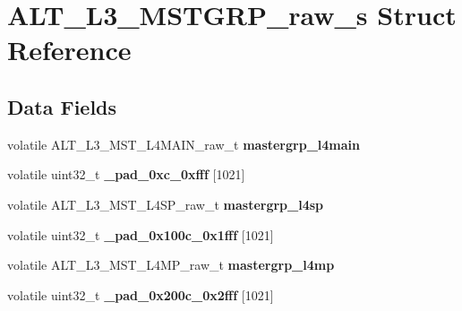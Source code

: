 \hypertarget{structALT__L3__MSTGRP__raw__s}{}\section{A\+L\+T\+\_\+\+L3\+\_\+\+M\+S\+T\+G\+R\+P\+\_\+raw\+\_\+s Struct Reference}
\label{structALT__L3__MSTGRP__raw__s}
\subsection*{Data Fields}
\begin{DoxyCompactItemize}
\item 
\mbox{\label{structALT__L3__MSTGRP__raw__s_a054aa92d14a3bdbed1e888969c726796}} 
volatile A\+L\+T\+\_\+\+L3\+\_\+\+M\+S\+T\+\_\+\+L4\+M\+A\+I\+N\+\_\+raw\+\_\+t {\bfseries mastergrp\+\_\+l4main}
\item 
\mbox{\label{structALT__L3__MSTGRP__raw__s_a0910771174de2a731a6bd7b555668793}} 
volatile uint32\+\_\+t {\bfseries \+\_\+pad\+\_\+0xc\+\_\+0xfff} \mbox{[}1021\mbox{]}
\item 
\mbox{\label{structALT__L3__MSTGRP__raw__s_a2958eceb5297b5a05408bfb61abd3637}} 
volatile A\+L\+T\+\_\+\+L3\+\_\+\+M\+S\+T\+\_\+\+L4\+S\+P\+\_\+raw\+\_\+t {\bfseries mastergrp\+\_\+l4sp}
\item 
\mbox{\label{structALT__L3__MSTGRP__raw__s_a08995bcd2bc62a74f121a98c9096e0b5}} 
volatile uint32\+\_\+t {\bfseries \+\_\+pad\+\_\+0x100c\+\_\+0x1fff} \mbox{[}1021\mbox{]}
\item 
\mbox{\label{structALT__L3__MSTGRP__raw__s_a2376da475de4cc954f0f394afec2b36a}} 
volatile A\+L\+T\+\_\+\+L3\+\_\+\+M\+S\+T\+\_\+\+L4\+M\+P\+\_\+raw\+\_\+t {\bfseries mastergrp\+\_\+l4mp}
\item 
\mbox{\label{structALT__L3__MSTGRP__raw__s_a4c620a950e4d01d95cfc8ea92a160ae0}} 
volatile uint32\+\_\+t {\bfseries \+\_\+pad\+\_\+0x200c\+\_\+0x2fff} \mbox{[}1021\mbox{]}
\item 
\mbox{\label{structALT__L3__MSTGRP__raw__s_a11b0232ea72c0fe49be76b1299c20b5d}} 

\end{DoxyCompactItemize}
